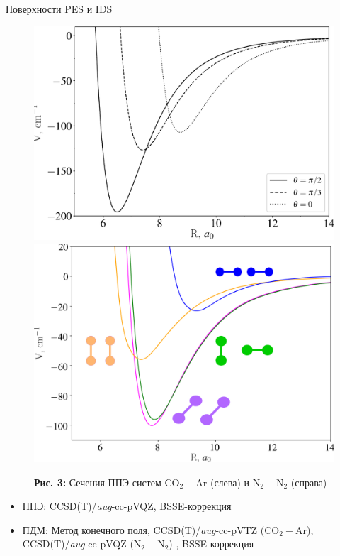 \documentclass[10pt,usenames,pdf,hyperref={unicode},dvipsnames]{beamer}
\newcommand{\mycaption}[2]{
    \textbf{#1:} #2
}
\begin{document}
\begin{frame}{Поверхности PES и IDS}
    \begin{figure}[H]
        \vspace*{-0.5cm}
        \includegraphics[width=0.49\linewidth]{./pictures/co2-ar-potential-legend-crop.pdf}
        \includegraphics[width=0.49\linewidth]{./pictures/n2n2_potential-trim.png}
        \mycaption{Рис. 3}{Сечения ППЭ систем CO$_2-$Ar (слева) и N$_2-$N$_2$ (справа)}
    \end{figure}
   
    \vspace*{-0.3cm}
    \begin{itemize}
        \item ППЭ: CCSD(T)/\textit{aug}-cc-pVQZ, BSSE-коррекция
        \item ПДМ: Метод конечного поля, CCSD(T)/\textit{aug}-cc-pVTZ (CO$_2-$Ar), CCSD(T)/\textit{aug}-cc-pVQZ (N$_2-$N$_2$) , BSSE-коррекция
    \end{itemize}
\end{frame}
\end{document}
